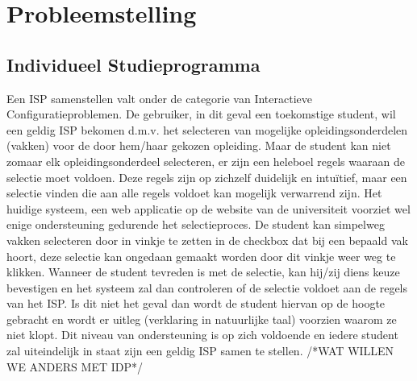 \section{Probleemstelling}

\subsection{Individueel Studieprogramma}
Een ISP samenstellen valt onder de categorie van Interactieve Configuratieproblemen. De gebruiker, in dit geval een toekomstige student, wil een geldig ISP bekomen d.m.v. het selecteren van mogelijke opleidingsonderdelen (vakken) voor de door hem/haar gekozen opleiding. Maar de student kan niet zomaar elk opleidingsonderdeel selecteren, er zijn een heleboel regels waaraan de selectie moet voldoen. Deze regels zijn op zichzelf duidelijk en intu\"{i}tief, maar een selectie vinden die aan alle regels voldoet kan mogelijk verwarrend zijn. Het huidige systeem, een web applicatie op de website van de universiteit voorziet wel enige ondersteuning gedurende het selectieproces. De student kan simpelweg vakken selecteren door in vinkje te zetten in de checkbox dat bij een bepaald vak hoort, deze selectie kan ongedaan gemaakt worden door dit vinkje weer weg te klikken. Wanneer de student tevreden is met de selectie, kan hij/zij diens keuze bevestigen en het systeem zal dan controleren of de selectie voldoet aan de regels van het ISP. Is dit niet het geval dan wordt de student hiervan op de hoogte gebracht en wordt er uitleg (verklaring in natuurlijke taal) voorzien waarom ze niet klopt. Dit niveau van ondersteuning is op zich voldoende en iedere student zal uiteindelijk in staat zijn een geldig ISP samen te stellen. /*WAT WILLEN WE ANDERS MET IDP*/

